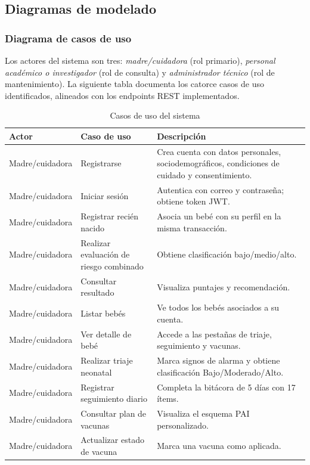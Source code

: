 \documentclass[12pt,letterpaper]{article}
\begin{document}
\subsection{Diagramas de modelado}

\subsubsection{Diagrama de casos de uso}

Los actores del sistema son tres: \textit{madre/cuidadora} (rol primario), \textit{personal académico o investigador} (rol de consulta) y \textit{administrador técnico} (rol de mantenimiento). La siguiente tabla documenta los catorce casos de uso identificados, alineados con los endpoints REST implementados.

\begin{longtable}{p{}p{}p{}}
\caption{Casos de uso del sistema}\\\toprule
\textbf{Actor} & \textbf{Caso de uso} & \textbf{Descripción} \\\midrule
\endhead
Madre/cuidadora & Registrarse & Crea cuenta con datos personales, sociodemográficos, condiciones de cuidado y consentimiento.\\\hline
Madre/cuidadora & Iniciar sesión & Autentica con correo y contraseña; obtiene token JWT.\\\hline
Madre/cuidadora & Registrar recién nacido & Asocia un bebé con su perfil en la misma transacción.\\\hline
Madre/cuidadora & Realizar evaluación de riesgo combinado & Obtiene clasificación bajo/medio/alto.\\\hline
Madre/cuidadora & Consultar resultado & Visualiza puntajes y recomendación.\\\hline
Madre/cuidadora & Listar bebés & Ve todos los bebés asociados a su cuenta.\\\hline
Madre/cuidadora & Ver detalle de bebé & Accede a las pestañas de triaje, seguimiento y vacunas.\\\hline
Madre/cuidadora & Realizar triaje neonatal & Marca signos de alarma y obtiene clasificación Bajo/Moderado/Alto.\\\hline
Madre/cuidadora & Registrar seguimiento diario & Completa la bitácora de 5 días con 17 ítems.\\\hline
Madre/cuidadora & Consultar plan de vacunas & Visualiza el esquema PAI personalizado.\\\hline
Madre/cuidadora & Actualizar estado de vacuna & Marca una vacuna como aplicada.\\\hline

\end{longtable}
\end{document}
